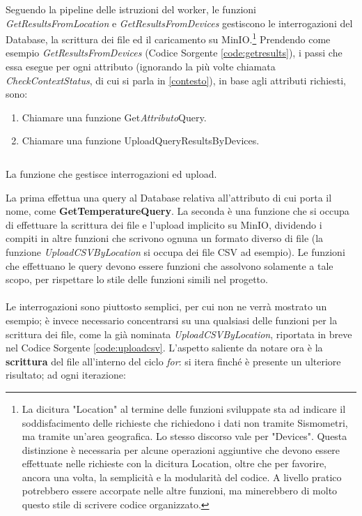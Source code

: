 Seguendo la pipeline delle istruzioni del worker, le funzioni \textit{GetResultsFromLocation} e \textit{GetResultsFromDevices} gestiscono le interrogazioni del Database, la scrittura dei file ed il caricamento su MinIO.\footnote{La dicitura "Location" al termine delle funzioni sviluppate sta ad indicare il soddisfacimento delle richieste che richiedono i dati non tramite Sismometri, ma tramite un'area geografica. Lo stesso discorso vale per "Devices". Questa distinzione è necessaria per alcune operazioni aggiuntive che devono essere effettuate nelle richieste con la dicitura Location, oltre che per favorire, ancora una volta, la semplicità e la modularità del codice. A livello pratico potrebbero essere accorpate nelle altre funzioni, ma minerebbero di molto questo stile di scrivere codice organizzato.} Prendendo come esempio \textit{GetResultsFromDevices} (Codice Sorgente \ref{code:getresults}), i passi che essa esegue per ogni attributo (ignorando la più volte chiamata \textit{CheckContextStatus}, di cui si parla in \ref{contesto}), in base agli attributi richiesti, sono:
\begin{enumerate}
    \item Chiamare una funzione Get\textit{Attributo}Query.
    \item Chiamare una funzione UploadQueryResultsByDevices.
\end{enumerate}
\begin{listing}[h!]
\inputminted[baselinestretch=0.8]{go}{sources/getresults.go}
\caption{La funzione che gestisce interrogazioni ed upload.}
\label{code:getresults}
\end{listing}
La prima effettua una query al Database relativa all'attributo di cui porta il nome, come \textbf{GetTemperatureQuery}. La seconda è una funzione che si occupa di effettuare la scrittura dei file e l'upload implicito su MinIO, dividendo i compiti in altre funzioni che scrivono ognuna un formato diverso di file (la funzione \textit{UploadCSVByLocation} si occupa dei file CSV ad esempio). Le funzioni che effettuano le query devono essere funzioni che assolvono solamente a tale scopo, per rispettare lo stile delle funzioni simili nel progetto.\\ \\
Le interrogazioni sono piuttosto semplici, per cui non ne verrà mostrato un esempio; è invece necessario concentrarsi su una qualsiasi delle funzioni per la scrittura dei file, come la già nominata \textit{UploadCSVByLocation}, riportata in breve nel Codice Sorgente \ref{code:uploadcsv}. L'aspetto saliente da notare ora è la \textbf{scrittura} del file all'interno del ciclo \textit{for}: si itera finché è presente un ulteriore risultato; ad ogni iterazione:
